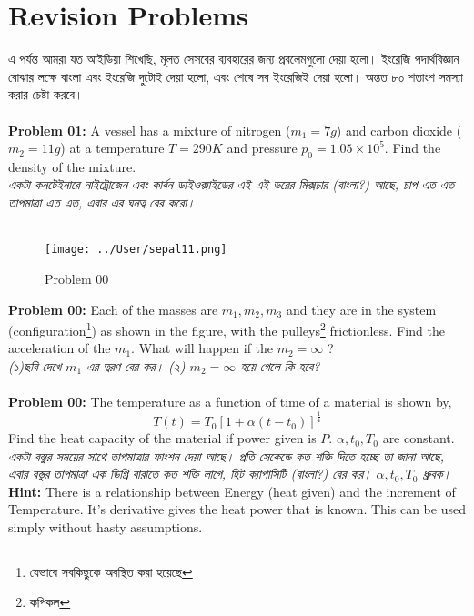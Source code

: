 \documentclass[12pt,a4paper]{article}
\begin{document}
\section{Revision Problems} 
এ পর্যন্ত আমরা যত আইডিয়া শিখেছি, মূলত সেসবের ব্যবহারের জন্য প্রবলেমগুলো দেয়া হলো। ইংরেজি পদার্থবিজ্ঞান বোঝার লক্ষে বাংলা এবং ইংরেজি দুটোই দেয়া হলো, এবং শেষে সব ইংরেজিই দেয়া হলো। অন্তত ৮০ শতাংশ সমস্যা করার চেষ্টা করবে। \\
\\
\textbf{Problem 01:} A vessel has a mixture of nitrogen ($m_1 = 7g$) and carbon dioxide ($m_2 = 11g$) at a temperature $T = 290K$ and pressure $p_0 = 1.05 \times 10^5$. Find the density of the mixture.\\
\textit{একটা কনটেইনারে নাইট্রোজেন এবং কার্বন ডাইওক্সাইডের এই এই ভরের মিক্সচার (বাংলা?) আছে, চাপ এত এত তাপমাত্রা এত এত, এবার এর ঘনত্ব বের করো।}\\
\\
\begin{figure}[hbtp]
\centering
\texttt{[image: ../User/sepal11.png]}
\caption{Problem 00}
\end{figure}
\textbf{Problem 00:} Each of the masses are $m_1,m_2,m_3$ and they are in the system (configuration\footnote{যেভাবে সবকিছুকে অবস্থিত করা হয়েছে}) as shown in the figure, with the pulleys\footnote{কপিকল} frictionless. Find the acceleration of the $m_1$. What will happen if the $m_2 = \infty$ ? \\
\textit{(১)ছবি দেখে $m_1$ এর ত্বরণ বের কর। (২) $m_2 = \infty$ হয়ে গেলে কি হবে?}\\
\\
\textbf{Problem 00:} The temperature as a function of time of a material is shown by,
\[ T(t) = T_0 [ 1 + \alpha (t - t_0) ] ^{\frac{1}{4}} \]
Find the heat capacity of the material if power given is $P$. $\alpha, t_0, T_0$ are constant. \\
\textit{একটা বস্তুর সময়ের সাথে তাপমাত্রার ফাংশন দেয়া আছে। প্রতি সেকেন্ডে কত শক্তি দিতে হচ্ছে তা জানা আছে, এবার বস্তুর তাপমাত্রা এক ডিগ্রি বারাতে কত শক্তি লাগে, হিট ক্যাপাসিটি (বাংলা?) বের কর। $\alpha, t_0, T_0$ ধ্রুবক।}\\
\textbf{Hint:} There is a relationship between Energy (heat given) and the increment of Temperature. It's derivative gives the heat power that is known. This can be used simply without hasty assumptions.










 





 
\end{document}

